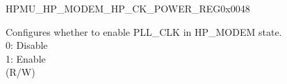 \begin{register}{H}{PMU\_HP\_MODEM\_HP\_CK\_POWER\_REG}{0x0048}\label{regdesc:PMUHPMODEMHPCKPOWERREG}
%
%
%
\regnewline%
\begin{regdesc}\begin{reglist}
\label{fielddesc:PMUHPMODEMXPDBBPLL}\item [PMU\_HP\_MODEM\_XPD\_BBPLL] Configures whether to  enable PLL\_CLK in HP\_MODEM state.\\
0: Disable\\
1: Enable\\
(R/W)
\end{reglist}\end{regdesc}
\end{register}


